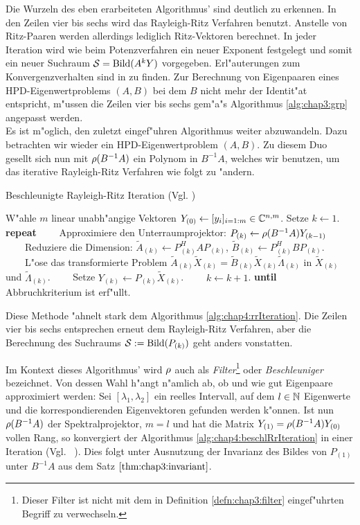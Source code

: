 Die Wurzeln des eben erarbeiteten Algorithmus' sind deutlich zu erkennen. In den Zeilen vier bis sechs wird das Rayleigh-Ritz Verfahren benutzt. Anstelle von Ritz-Paaren werden allerdings lediglich Ritz-Vektoren berechnet. In jeder Iteration wird wie beim Potenzverfahren ein neuer Exponent festgelegt und somit ein neuer Suchraum $\mathcal{S} = \operatorname{Bild}(A^k Y)$ vorgegeben. Erl"auterungen zum Konvergenzverhalten sind in \cite[Abschnitt 5]{saad} zu finden. Zur Berechnung von Eigenpaaren eines HPD-Eigenwertproblems $(A,B)$ bei dem $B$ nicht mehr der Identit"at entspricht, m"ussen die Zeilen vier bis sechs gem"a"s Algorithmus \ref{alg:chap3:grp} angepasst werden.\\

Es ist m"oglich, den zuletzt eingef"uhren Algorithmus weiter abzuwandeln. Dazu betrachten wir wieder ein HPD-Eigenwertproblem $(A,B)$. Zu diesem Duo gesellt sich nun mit $\rho(B^{-1}A)$ ein Polynom in $B^{-1}A$, welches wir benutzen, um das iterative Rayleigh-Ritz Verfahren wie folgt zu "andern.

\begin{algorithm}
\caption{Beschleunigte Rayleigh-Ritz Iteration (Vgl. \cite[Algorithmus A]{ptep})}\label{alg:chap4:beschlRrIteration}
\begin{algorithmic}[1]
\State W"ahle $m$ linear unabh"angige Vektoren $Y_{(0)} \gets [y_i]_{i=1:m} \in\mathbb{C}^{n,m}$.
Setze $k \gets 1$.
\State \textbf{repeat}
\State \ \ \ \ Approximiere den Unterraumprojektor: $P_{(k)} \gets \rho(B^{-1}A)Y_{(k-1)}$
\State \ \ \ \ Reduziere die Dimension: $\widetilde{A}_{(k)} \gets P_{(k)}^H A P_{(k)}$,
$\widetilde{B}_{(k)} \gets P_{(k)}^H B P_{(k)}$.
\State \ \ \ \ L"ose das transformierte Problem $\widetilde{A}_{(k)}\widetilde{X}_{(k)}
= \widetilde{B}_{(k)}\widetilde{X}_{(k)}\widetilde{\Lambda}_{(k)}$ in
$\widetilde{X}_{(k)}$ und $\widetilde{\Lambda}_{(k)}$.
\State \ \ \ \ Setze $Y_{(k)} \gets P_{(k)}\widetilde{X}_{(k)}$.
\State \ \ \ \ $k \gets k+1$.
\State \textbf{until} Abbruchkriterium ist erf"ullt.
\end{algorithmic}
\end{algorithm}

Diese Methode "ahnelt stark dem Algorithmus \ref{alg:chap4:rrIteration}. Die Zeilen vier bis sechs entsprechen erneut dem Rayleigh-Ritz Verfahren, aber die Berechnung des Suchraums $\mathcal{S} := \operatorname{Bild}(P_{(k)})$ geht anders vonstatten.

\newpage

Im Kontext dieses Algorithmus' wird $\rho$ auch als \emph{Filter}\footnote{Dieser Filter ist nicht mit dem in Definition \ref{defn:chap3:filter} eingef"uhrten Begriff zu verwechseln.} oder \emph{Beschleuniger}
bezeichnet. Von dessen Wahl h"angt n"amlich ab, ob und wie gut Eigenpaare approximiert
werden: Sei $[\lambda_1,\lambda_2]$ ein reelles Intervall, auf dem $l\in\mathbb{N}$ Eigenwerte und die korrespondierenden Eigenvektoren gefunden werden k"onnen. Ist nun $\rho(B^{-1}A)$ der Spektralprojektor,
$m=l$ und hat die Matrix $Y_{(1)} = \rho(B^{-1}A) Y_{(0)}$ vollen Rang, so konvergiert der Algorithmus \ref{alg:chap4:beschlRrIteration} in einer Iteration
(Vgl. ~\cite[356]{ptep}).
Dies folgt unter Ausnutzung der Invarianz des Bildes von $P_{(1)}$ unter $B^{-1}A$
aus dem Satz $\ref{thm:chap3:invariant}$.\\

